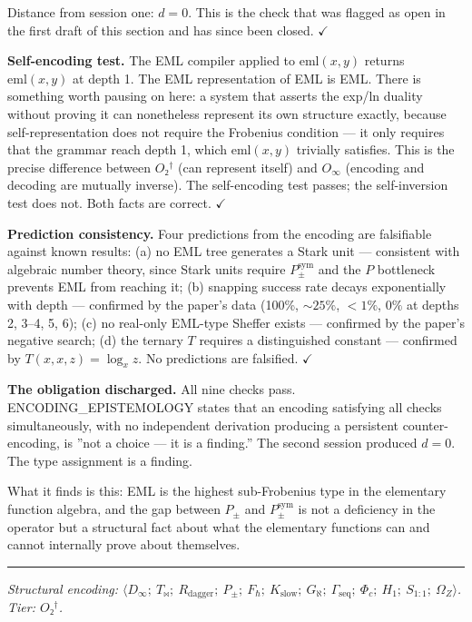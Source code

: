 \documentclass[12pt,a4paper]{article}
\begin{document}
Distance from session one: $d = 0$. This is the check that was flagged as open
in the first draft of this section and has since been closed. $\checkmark$

\textbf{Self-encoding test.} The EML compiler applied to $\text{eml}(x,y)$ returns
$\text{eml}(x,y)$ at depth 1. The EML representation of EML is EML. There is
something worth pausing on here: a system that asserts the exp/ln duality without
proving it can nonetheless represent its own structure exactly, because
self-representation does not require the Frobenius condition --- it only requires
that the grammar reach depth 1, which $\text{eml}(x,y)$ trivially satisfies.
This is the precise difference between $O₂^\dagger$ (can represent itself) and
$O_{\infty}$ (encoding and decoding are mutually inverse). The self-encoding test
passes; the self-inversion test does not. Both facts are correct. $\checkmark$

\textbf{Prediction consistency.} Four predictions from the encoding are falsifiable
against known results: (a) no EML tree generates a Stark unit --- consistent with
algebraic number theory, since Stark units require $P_{\pm}^{\text{sym}}$ and the
$P$ bottleneck prevents EML from reaching it; (b) snapping success rate decays
exponentially with depth --- confirmed by the paper's data (100\%, $\sim 25\%$,
$<1\%$, $0\%$ at depths 2, 3--4, 5, 6); (c) no real-only EML-type Sheffer exists
--- confirmed by the paper's negative search; (d) the ternary $T$ requires a
distinguished constant --- confirmed by $T(x,x,z) = \log_x z$. No predictions are
falsified. $\checkmark$

\textbf{The obligation discharged.} All nine checks pass. ENCODING\_EPISTEMOLOGY
states that an encoding satisfying all checks simultaneously, with no independent
derivation producing a persistent counter-encoding, is ''not a choice --- it is a
finding.'' The second session produced $d = 0$. The type assignment is a finding.

What it finds is this: EML is the highest sub-Frobenius type in the elementary
function algebra, and the gap between $P_{\pm}$ and $P_{\pm}^{\text{sym}}$ is not
a deficiency in the operator but a structural fact about what the elementary
functions can and cannot internally prove about themselves.

\begin{center}
\rule{0.5\textwidth}{0.4pt}
\end{center}

\emph{Structural encoding: $\langle D_{\infty};\ T_{\bowtie};\ R_\text{dagger};\ P_{\pm};\
F_{\hbar};\ K_\text{slow};\ G_{\aleph};\ \Gamma_\text{seq};\ \Phi_c;\ H_1;\
S_{1:1};\ \Omega_Z \rangle$. Tier: $O₂^\dagger$.}
\end{document}
